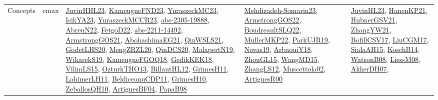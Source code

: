 {\begin{longtable}{lp{3cm}>{\raggedright}p{6cm}>{\raggedright}p{6cm}p{8cm}}
Concepts & cmax & \href{papers/JuvinHHL23.pdf}{JuvinHHL23}\cite{JuvinHHL23}, \href{papers/KameugneFND23.pdf}{KameugneFND23}\cite{KameugneFND23}, \href{papers/YuraszeckMC23.pdf}{YuraszeckMC23}\cite{YuraszeckMC23}, \href{articles/IsikYA23.pdf}{IsikYA23}\cite{IsikYA23}, \href{articles/YuraszeckMCCR23.pdf}{YuraszeckMCCR23}\cite{YuraszeckMCCR23}, \href{articles/abs-2305-19888.pdf}{abs-2305-19888}\cite{abs-2305-19888}, \href{articles/AbreuN22.pdf}{AbreuN22}\cite{AbreuN22}, \href{articles/FetgoD22.pdf}{FetgoD22}\cite{FetgoD22}, \href{articles/abs-2211-14492.pdf}{abs-2211-14492}\cite{abs-2211-14492}, \href{papers/ArmstrongGOS21.pdf}{ArmstrongGOS21}\cite{ArmstrongGOS21}, \href{articles/AbohashimaEG21.pdf}{AbohashimaEG21}\cite{AbohashimaEG21}, \href{articles/QinWSLS21.pdf}{QinWSLS21}\cite{QinWSLS21}, \href{papers/GodetLHS20.pdf}{GodetLHS20}\cite{GodetLHS20}, \href{articles/MengZRZL20.pdf}{MengZRZL20}\cite{MengZRZL20}, \href{articles/QinDCS20.pdf}{QinDCS20}\cite{QinDCS20}, \href{papers/MalapertN19.pdf}{MalapertN19}\cite{MalapertN19}, \href{articles/WikarekS19.pdf}{WikarekS19}\cite{WikarekS19}, \href{papers/KameugneFGOQ18.pdf}{KameugneFGOQ18}\cite{KameugneFGOQ18}, \href{articles/GedikKEK18.pdf}{GedikKEK18}\cite{GedikKEK18}, \href{papers/VilimLS15.pdf}{VilimLS15}\cite{VilimLS15}, \href{articles/OzturkTHO13.pdf}{OzturkTHO13}\cite{OzturkTHO13}, \href{papers/BillautHL12.pdf}{BillautHL12}\cite{BillautHL12}, \href{papers/GrimesH11.pdf}{GrimesH11}\cite{GrimesH11}, \href{papers/LahimerLH11.pdf}{LahimerLH11}\cite{LahimerLH11}, \href{articles/BeldiceanuCDP11.pdf}{BeldiceanuCDP11}\cite{BeldiceanuCDP11}, \href{papers/GrimesH10.pdf}{GrimesH10}\cite{GrimesH10}, \href{articles/ZeballosQH10.pdf}{ZeballosQH10}\cite{ZeballosQH10}, \href{papers/ArtiguesBF04.pdf}{ArtiguesBF04}\cite{ArtiguesBF04}, \href{articles/PapaB98.pdf}{PapaB98}\cite{PapaB98} & \href{papers/Mehdizadeh-Somarin23.pdf}{Mehdizadeh-Somarin23}\cite{Mehdizadeh-Somarin23}, \href{papers/ArmstrongGOS22.pdf}{ArmstrongGOS22}\cite{ArmstrongGOS22}, \href{papers/BoudreaultSLQ22.pdf}{BoudreaultSLQ22}\cite{BoudreaultSLQ22}, \href{articles/MullerMKP22.pdf}{MullerMKP22}\cite{MullerMKP22}, \href{papers/ParkUJR19.pdf}{ParkUJR19}\cite{ParkUJR19}, \href{articles/Novas19.pdf}{Novas19}\cite{Novas19}, \href{papers/ArbaouiY18.pdf}{ArbaouiY18}\cite{ArbaouiY18}, \href{papers/ZhouGL15.pdf}{ZhouGL15}\cite{ZhouGL15}, \href{articles/WangMD15.pdf}{WangMD15}\cite{WangMD15}, \href{papers/ZhangLS12.pdf}{ZhangLS12}\cite{ZhangLS12}, \href{papers/Muscettola02.pdf}{Muscettola02}\cite{Muscettola02}, \href{articles/ArtiguesR00.pdf}{ArtiguesR00}\cite{ArtiguesR00} & \href{papers/JuvinHL23.pdf}{JuvinHL23}\cite{JuvinHL23}, \href{papers/HanenKP21.pdf}{HanenKP21}\cite{HanenKP21}, \href{articles/HubnerGSV21.pdf}{HubnerGSV21}\cite{HubnerGSV21}, \href{articles/ZhangYW21.pdf}{ZhangYW21}\cite{ZhangYW21}, \href{papers/BofillCSV17.pdf}{BofillCSV17}\cite{BofillCSV17}, \href{papers/LiuCGM17.pdf}{LiuCGM17}\cite{LiuCGM17}, \href{papers/SialaAH15.pdf}{SialaAH15}\cite{SialaAH15}, \href{papers/KoschB14.pdf}{KoschB14}\cite{KoschB14}, \href{papers/WatsonB08.pdf}{WatsonB08}\cite{WatsonB08}, \href{articles/LiessM08.pdf}{LiessM08}\cite{LiessM08}, \href{papers/AkkerDH07.pdf}{AkkerDH07}\cite{AkkerDH07}, 
\end{longtable}}

